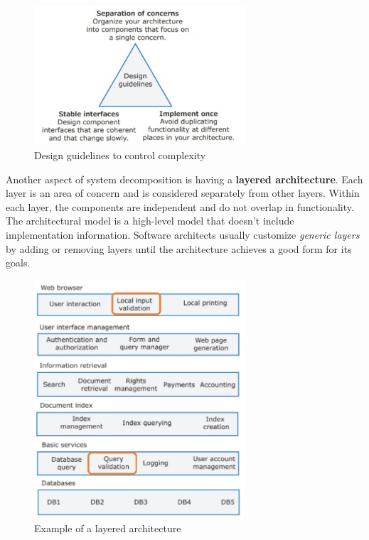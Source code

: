 \begin{figure} [H]
    \centering
    \includegraphics[width=0.7\textwidth]{images/SoftwareArchitecture/designguidelines.png}
    \caption{Design guidelines to control complexity}
    \label{fig:designguidelines}
\end{figure}

\newpage

Another aspect of system decomposition is having a \textbf{layered architecture}. Each layer is an area of concern and is considered separately from other layers. Within each layer, the components are independent and do not overlap in functionality. The architectural model is a high-level model that doesn't include implementation information. Software architects usually customize \emph{generic layers} by adding or removing layers until the architecture achieves a good form for its goals.

\begin{figure} [H]
    \centering
    \includegraphics[width=0.7\textwidth]{images/SoftwareArchitecture/layaredarchitecture.png}
    \caption{Example of a layered architecture}
    \label{fig:layaredarchitecture}
\end{figure}

